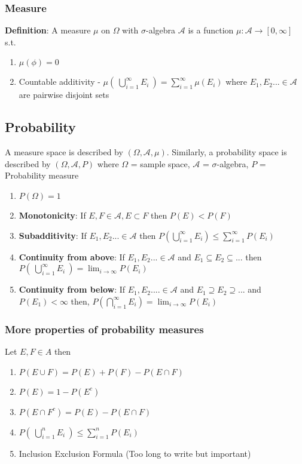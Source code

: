 \documentclass[12pt]{article}
\begin{document}
\subsubsection{Measure}
\textbf{Definition}: A measure $\mu$ on $\Omega$ with $\sigma$-algebra $\mathcal{A}$ is a function $\mu : \mathcal{A} \xrightarrow{} [0,\infty]$ s.t.
\begin{enumerate}
    \item $\mu(\phi) = 0$
    \item Countable additivity - $\mu(\: \bigcup\limits_{i=1}^{\infty}E_{i} \:) = \sum\limits_{i=1}^{\infty} \mu(E_{i})$ where $E_1, E_2... \in \mathcal{A}$ are pairwise disjoint sets 
\end{enumerate}

\subsection{Probability}
A measure space is described by $(\Omega, \mathcal{A}, \mu)$. Similarly, a probability space is described by $(\Omega, \mathcal{A}, P)$ where $\Omega$ = sample space, $\mathcal{A}$ = $\sigma$-algebra, $P$ = Probability measure
\begin{enumerate}
    \item $P(\Omega) = 1$
    \item \textbf{Monotonicity}: If $E,F \in \mathcal{A}, E \subset F$ then $P(E) < P(F)$
    \item \textbf{Subadditivity}: If $E_{1}, E_{2}... \in \mathcal{A}$ then $P(\bigcup\limits_{i=1}^{\infty}E_i) \leq \sum\limits_{i=1}^{\infty} P(E_i)$
    \item \textbf{Continuity from above}: If $E_{1}, E_{2}... \in \mathcal{A}$ and $E_1 \subseteq E_2 \subseteq$... then $P(\: \bigcup\limits_{i=1}^{\infty}E_{i} \:) = \lim_{i\to\infty} P(E_i)$
    \item \textbf{Continuity from below}: If $E_1, E_2 .... \in \mathcal{A}$ and $E_1 \supseteq E_2 \supseteq$... \: and $P(E_1) < \infty$ then, \: $P(\bigcap\limits_{i=1}^{\infty}E_i) = \lim_{i \to\infty}P(E_i)$
\end{enumerate}

\subsubsection{More properties of probability measures}
Let $E,F \in A$ then 
\begin{enumerate}
    \item $P(E \cup F) = P(E) + P(F) - P(E \cap F)$
    \item $P(E) = 1 - P(E^{c})$
    \item $P(E \cap F^{c}) = P(E) - P(E \cap F)$
    \item $P(\: \bigcup\limits_{i=1}^{n}E_{i} \:) \leq \sum\limits_{i=1}^{n}P(E_i)$ 
    \item Inclusion Exclusion Formula (Too long to write but important)  
\end{enumerate}
\end{document}
